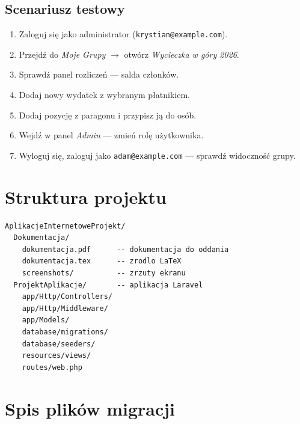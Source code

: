 \documentclass[12pt,a4paper]{report}
\begin{document}
\section{Scenariusz testowy}

\begin{enumerate}[leftmargin=*]
    \item Zaloguj si\k{e} jako administrator (\texttt{krystian@example.com}).
    \item Przejd\'z do \emph{Moje Grupy} $\rightarrow$ otw\'orz \emph{Wycieczka w g\'ory 2026}.
    \item Sprawd\'z panel rozlicze\'n --- salda cz\l{}onk\'ow.
    \item Dodaj nowy wydatek z wybranym p\l{}atnikiem.
    \item Dodaj pozycj\k{e} z paragonu i przypisz j\k{a} do os\'ob.
    \item Wejd\'z w panel \emph{Admin} --- zmie\'n rol\k{e} u\.zytkownika.
    \item Wyloguj si\k{e}, zaloguj jako \texttt{adam@example.com} --- sprawd\'z widoczno\'s\'c grupy.
\end{enumerate}

\chapter{Struktura projektu}

\begin{lstlisting}[style=pseudostyle, caption={Struktura repozytorium}]
AplikacjeInternetoweProjekt/
  Dokumentacja/
    dokumentacja.pdf      -- dokumentacja do oddania
    dokumentacja.tex      -- zrodlo LaTeX
    screenshots/          -- zrzuty ekranu
  ProjektAplikacje/       -- aplikacja Laravel
    app/Http/Controllers/
    app/Http/Middleware/
    app/Models/
    database/migrations/
    database/seeders/
    resources/views/
    routes/web.php
\end{lstlisting}

\appendix
\chapter{Spis plik\'ow migracji}
\end{document}
